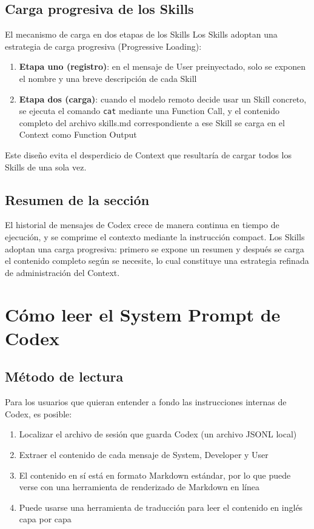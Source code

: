 \documentclass[a4paper]{article}
\begin{document}
\subsection{Carga progresiva de los Skills}

\begin{knowledgebox}{El mecanismo de carga en dos etapas de los Skills}
Los Skills adoptan una estrategia de carga progresiva (Progressive Loading):
\begin{enumerate}
    \item \textbf{Etapa uno (registro)}: en el mensaje de User preinyectado, solo se exponen el nombre y una breve descripción de cada Skill
    \item \textbf{Etapa dos (carga)}: cuando el modelo remoto decide usar un Skill concreto, se ejecuta el comando \texttt{cat} mediante una Function Call, y el contenido completo del archivo skills.md correspondiente a ese Skill se carga en el Context como Function Output
\end{enumerate}
Este diseño evita el desperdicio de Context que resultaría de cargar todos los Skills de una sola vez.
\end{knowledgebox}

\subsection{Resumen de la sección}

El historial de mensajes de Codex crece de manera continua en tiempo de ejecución, y se comprime el contexto mediante la instrucción compact. Los Skills adoptan una carga progresiva: primero se expone un resumen y después se carga el contenido completo según se necesite, lo cual constituye una estrategia refinada de administración del Context.
\section{Cómo leer el System Prompt de Codex}

\subsection{Método de lectura}

Para los usuarios que quieran entender a fondo las instrucciones internas de Codex, es posible:

\begin{enumerate}
    \item Localizar el archivo de sesión que guarda Codex (un archivo JSONL local)
    \item Extraer el contenido de cada mensaje de System, Developer y User
    \item El contenido en sí está en formato Markdown estándar, por lo que puede verse con una herramienta de renderizado de Markdown en línea
    \item Puede usarse una herramienta de traducción para leer el contenido en inglés capa por capa
\end{enumerate}
\end{document}
